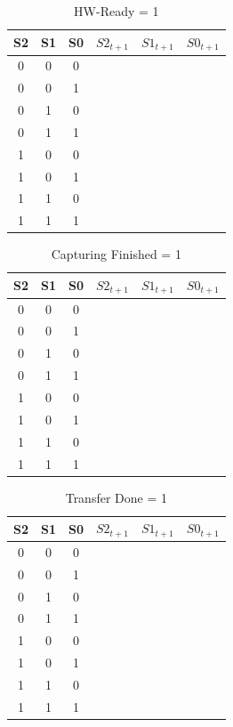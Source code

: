 \documentclass[a4paper]{scrartcl}
\begin{document}
\begin{table}[h]
  \centering
  \begin{tabular}{ccc|ccc}
    S2 & S1 & S0 & $S2_{t+1}$ & $S1_{t+1}$ & $S0_{t+1}$\\ \hline
    0&0&0& & & \\
    0&0&1& & & \\
    0&1&0& & & \\
    0&1&1& & & \\
    1&0&0& & & \\
    1&0&1& & & \\
    1&1&0& & & \\
    1&1&1& & & \\
    
  \end{tabular}
  \caption{HW-Ready = 1}
\end{table}

\begin{table}[h]
  \centering
  \begin{tabular}{ccc|ccc}
    S2 & S1 & S0 & $S2_{t+1}$ & $S1_{t+1}$ & $S0_{t+1}$\\ \hline
    0&0&0& & & \\
    0&0&1& & & \\
    0&1&0& & & \\
    0&1&1& & & \\
    1&0&0& & & \\
    1&0&1& & & \\
    1&1&0& & & \\
    1&1&1& & & \\
    
  \end{tabular}
  \caption{Capturing Finished = 1}
\end{table}

\begin{table}[h]
  \centering
  \begin{tabular}{ccc|ccc}
    S2 & S1 & S0 & $S2_{t+1}$ & $S1_{t+1}$ & $S0_{t+1}$\\ \hline
    0&0&0& & & \\
    0&0&1& & & \\
    0&1&0& & & \\
    0&1&1& & & \\
    1&0&0& & & \\
    1&0&1& & & \\
    1&1&0& & & \\
    1&1&1& & & \\
    
  \end{tabular}
  \caption{Transfer Done = 1}
\end{table}
\end{document}
